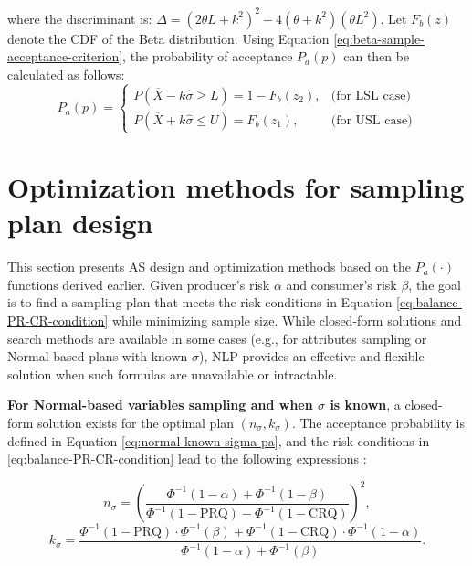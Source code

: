 where the discriminant is:
\(\Delta = \left(2\theta L + k^2\right)^2 - 4\left(\theta + k^2\right)\left(\theta L^2\right).\)
Let \(F_b(z)\) denote the CDF of the Beta distribution. Using Equation
\eqref{eq:beta-sample-acceptance-criterion}, the probability of acceptance \(P_a(p)\)
can then be calculated as follows:
\begin{equation}
P_a(p) =
\begin{cases}
P(\overline{X} - k\hat{\sigma} \ge L) = 1 - F_b(z_2), & \text{(for LSL case)} \\
P(\overline{X} + k\hat{\sigma} \le U) = F_b(z_1), & \text{(for USL case)}
\end{cases}
  \label{eq:beta-pa-known}
\end{equation}

\section{Optimization methods for sampling plan design}\label{optimization-methods-for-sampling-plan-design}

This section presents AS design and optimization methods based on the
\(P_a(\cdot)\) functions derived earlier. Given producer's risk \(\alpha\) and
consumer's risk \(\beta\), the goal is to find a sampling plan that meets the
risk conditions in Equation \eqref{eq:balance-PR-CR-condition} while minimizing
sample size. While closed-form solutions and search methods are available in some
cases (e.g., for attributes sampling or Normal-based plans with known \(\sigma\)),
NLP provides an effective and flexible solution when such formulas are unavailable
or intractable.

\textbf{For Normal-based variables sampling and when \(\sigma\) is known}, a closed-form
solution exists for the optimal plan \((n_\sigma, k_\sigma)\). The acceptance
probability is defined in Equation \eqref{eq:normal-known-sigma-pa}, and the risk
conditions in \eqref{eq:balance-PR-CR-condition} lead to the following expressions
\citep{wilrich2004single}:

\begin{equation}
n_{\sigma} = \left( \frac{\Phi^{-1}(1 - \alpha) + \Phi^{-1}(1 - \beta)}{\Phi^{-1}(1 - \text{PRQ}) - \Phi^{-1}(1 - \text{CRQ})} \right)^2, 
  \label{eq:normal-known-sigma-opt-n}
\end{equation}
\begin{equation}
k_{\sigma} = \frac{\Phi^{-1}(1 - \text{PRQ}) \cdot \Phi^{-1}(\beta) + \Phi^{-1}(1 - \text{CRQ}) \cdot \Phi^{-1}(1 - \alpha)}{\Phi^{-1}(1 - \alpha) + \Phi^{-1}(\beta)}. 
  \label{eq:normal-known-sigma-opt-k}
\end{equation}

